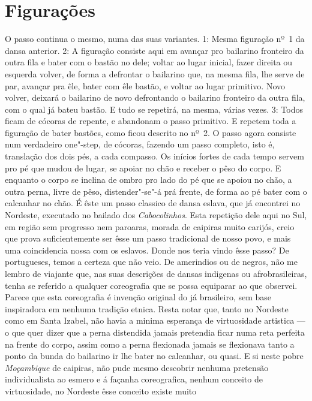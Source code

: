 \section{Figurações}

O passo continua o mesmo, numa das suas variantes. 1: Mesma figuração nº~1 da dansa anterior. 2: A figuração consiste aqui em avançar pro
bailarino fronteiro da outra fila e bater com o bastão no dele; voltar
ao lugar inicial, fazer direita ou esquerda volver, de forma a defrontar
o bailarino que, na mesma fila, lhe serve de par, avançar pra êle, bater
com êle bastão, e voltar ao lugar primitivo. Novo volver, deixará o
bailarino de novo defrontando o bailarino fronteiro da outra fila, com o
qual já bateu bastão. E tudo se repetirá, na mesma, várias vezes. 3:
Todos ficam de cócoras de repente, e abandonam o passo primitivo. E
repetem toda a figuração de bater bastões, como ficou descrito no nº~2.
O passo agora consiste num verdadeiro one"-step, de cócoras, fazendo um
passo completo, isto é, translação dos dois pés, a cada compasso. Os
inícios fortes de cada tempo servem pro pé que mudou de lugar, se apoiar
no chão e receber o pêso do corpo. E enquanto o corpo se inclina de
ombro pro lado do pé que se apoiou no chão, a outra perna, livre de
pêso, distender"-se"-á prá frente, de forma ao pé bater com o calcanhar no
chão. É êste um passo classico de dansa eslava, que já encontrei no
Nordeste, executado no bailado dos \emph{Cabocolinhos}. Esta repetição
dele aqui no Sul, em região sem progresso nem paroaras, morada de
caipiras muito carijós, creio que prova suficientemente ser êsse um
passo tradicional de nosso povo, e mais uma coincidencia nossa com os
eslavos. Donde nos teria vindo êsse passo? De portugueses, temos a
certeza que não veio. De amerindios ou de negros, não me lembro de
viajante que, nas suas descrições de dansas indigenas ou
afrobrasileiras, tenha se referido a qualquer coreografia que se possa
equiparar ao que observei. Parece que esta coreografia é invenção
original do já brasileiro, sem base inspiradora em nenhuma tradição
etnica. Resta notar que, tanto no Nordeste como em Santa Izabel, não
havia a minima esperança de virtuosidade artistica --- o que quer dizer
que a perna distendida jamais pretendia ficar numa reta perfeita na
frente do corpo, assim como a perna flexionada jamais se flexionava
tanto a ponto da bunda do bailarino ir lhe bater no calcanhar, ou quasi.
E si neste pobre \emph{Moçambique} de caipiras, não pude mesmo descobrir
nenhuma pretensão individualista ao esmero e á façanha coreografica,
nenhum conceito de virtuosidade, no Nordeste êsse conceito existe muito
